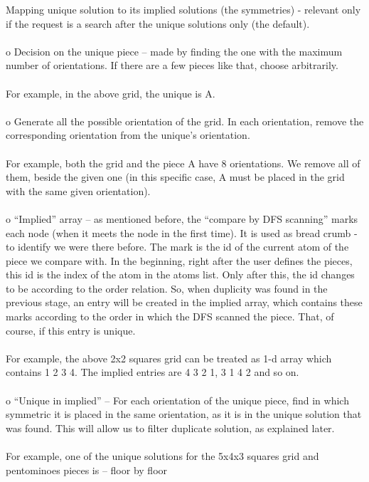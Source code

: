 \documentclass[a4paper,twoside,10pt]{report}
\begin{document}
Mapping unique solution to its implied solutions (the symmetries) - relevant only if the request is a search after the unique solutions only (the default).
\\
\\
o	Decision on the unique piece – made by finding the one with the maximum number of orientations. If there are a few pieces like that, choose arbitrarily.
\\
\\
For example, in the above grid, the unique is A.
\\
\\
o	Generate all the possible orientation of the grid. In each orientation, remove the corresponding orientation from the unique’s orientation.
\\
\\
For example, both the grid and the piece A have 8 orientations. We remove all of them, beside the given one (in this specific case, A must be placed in the grid with the same given orientation).
\\
\\
o	“Implied” array – as mentioned before, the “compare by DFS scanning” marks each node (when it meets the node in the first time). It is used as bread crumb - to identify we were there before. The mark is the id of the current atom of the piece we compare with. In the beginning, right after the user defines the pieces, this id is the index of the atom in the atoms list. Only after this, the id changes to be according to the order relation. So, when duplicity was found in the previous stage, an entry will be created in the implied array, which contains these marks according to the order in which the DFS scanned the piece. That, of course, if this entry is unique.
\\
\\
For example, the above 2x2 squares grid can be treated as 1-d array which contains 1 2 3 4. The implied entries are 4 3 2 1, 3 1 4 2 and so on.
\\
\\
o	“Unique in implied” – For each orientation of the unique piece, find in which symmetric it is placed in the same orientation, as it is in the unique solution that was found. This will allow us to filter duplicate solution, as explained later.
\\
\\
For example, one of the unique solutions for the 5x4x3 squares grid and pentominoes pieces is – floor by floor
\\\\
\end{document}
